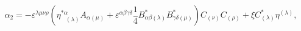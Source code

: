 \begin{equation}
\alpha _{2}=-\varepsilon ^{\lambda \mu \nu \rho }\left( \eta
_{\;\;\;(\lambda )}^{*\alpha }A_{\alpha (\mu )}+\varepsilon ^{\alpha \beta
\gamma \delta }\frac{1}{4}B_{\alpha \beta (\lambda )}^{*}B_{\gamma \delta
(\mu )}^{*}\right) C_{(\nu )}C_{(\rho )}+\xi C_{(\lambda )}^{*}\eta
^{(\lambda )},  \label{cin26}
\end{equation}

